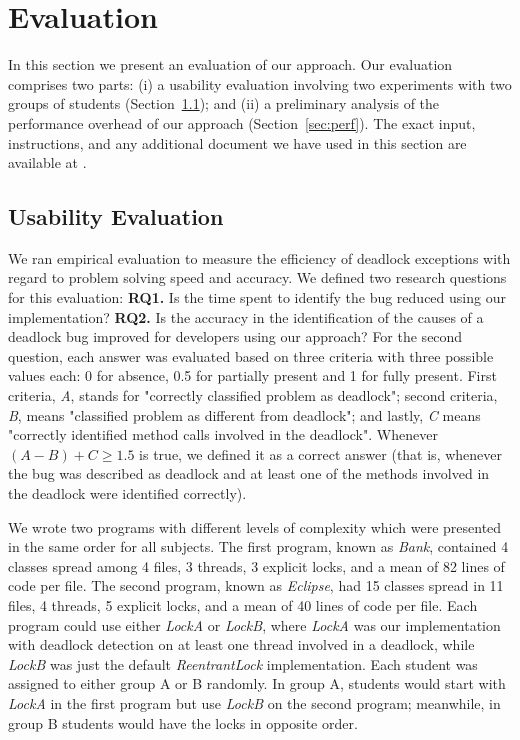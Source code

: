 \section{Evaluation}

In this section we present an evaluation of our approach. Our evaluation comprises two parts: (i) a usability evaluation involving two experiments with two groups of students (Section~\ref{sec:usab}); and (ii) a preliminary analysis of the performance overhead of our approach (Section~\ref{sec:perf}).  The exact input, instructions, and any additional document we have used in this section are available at \cite{repo}.

\subsection{Usability Evaluation}\label{sec:usab}

We ran empirical evaluation to measure the efficiency of deadlock exceptions with regard to problem solving speed and accuracy. We defined two research questions for this evaluation: {\bf RQ1.} Is the time spent to identify the bug reduced using our implementation? {\bf RQ2.} Is the accuracy in the identification of the causes of a deadlock bug improved for developers using our approach? For the second question, each answer was evaluated based on three criteria with three possible values each: 0 for absence, 0.5 for partially present and 1 for fully present. First criteria, \emph{A}, stands for "correctly classified problem as deadlock"; second criteria, \emph{B}, means "classified problem as different from deadlock"; and lastly, \emph{C} means "correctly identified method calls involved in the deadlock". Whenever $(A - B) + C \geq 1.5$ is true, we defined it as a correct answer (that is, whenever the bug was described as deadlock and at least one of the methods involved in the deadlock were identified correctly).

We wrote two programs with different levels of complexity which were presented in the same order for all subjects. The first program, known as \emph{Bank}, contained 4 classes spread among 4 files, 3 threads, 3 explicit locks, and a mean of 82 lines of code per file. The second program, known as \emph{Eclipse}, had 15 classes spread in 11 files, 4 threads, 5 explicit locks, and a mean of 40 lines of code per file. Each program could use either \emph{LockA} or \emph{LockB}, where \emph{LockA} was our implementation with deadlock detection on at least one thread involved in a deadlock, while \emph{LockB} was just the default \emph{ReentrantLock} implementation. Each student was assigned to either group A or B randomly. In group A, students would start with \emph{LockA} in the first program but use \emph{LockB} on the second program; meanwhile, in group B students would have the locks in opposite order.

